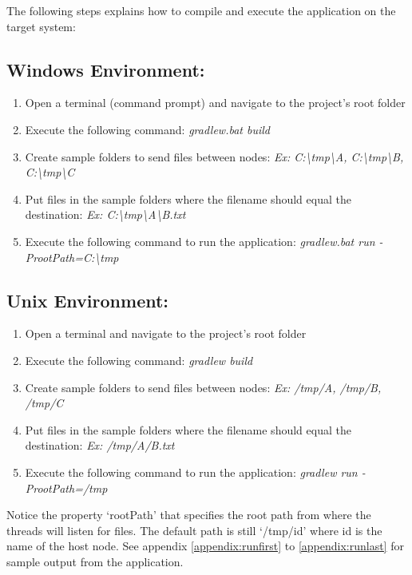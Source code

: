 \documentclass{scrartcl}
\begin{document}
The following steps explains how to compile and execute the application on the target system:

\subsection{Windows Environment:}
\begin{enumerate}
\item Open a terminal (command prompt) and navigate to the project's root folder
\item Execute the following command: \emph{gradlew.bat build}
\item Create sample folders to send files between nodes: \emph{Ex: {C:\textbackslash tmp\textbackslash A}, {C:\textbackslash tmp\textbackslash B}, {C:\textbackslash tmp\textbackslash C}}
\item Put files in the sample folders where the filename should equal the destination: \emph{Ex: {C:\textbackslash tmp\textbackslash A\textbackslash B.txt}}
\item Execute the following command to run the application: \emph{gradlew.bat run -ProotPath=C:\textbackslash tmp}
\end{enumerate}

\subsection{Unix Environment:}
\begin{enumerate}
\item Open a terminal and navigate to the project's root folder
\item Execute the following command: \emph{gradlew build}
\item Create sample folders to send files between nodes: \emph{Ex: /tmp/A, /tmp/B, /tmp/C}
\item Put files in the sample folders where the filename should equal the destination: \emph{Ex: /tmp/A/B.txt}
\item Execute the following command to run the application: \emph{gradlew run -ProotPath=/tmp}
\end{enumerate}

Notice the property ‘rootPath’ that specifies the root path from where the threads will listen for files. The default path is still ‘/tmp/{id}’ where id is the name of the host node. See appendix \ref{appendix:runfirst} to \ref{appendix:runlast} for sample output from the application.

\newpage
\appendix
\end{document}
